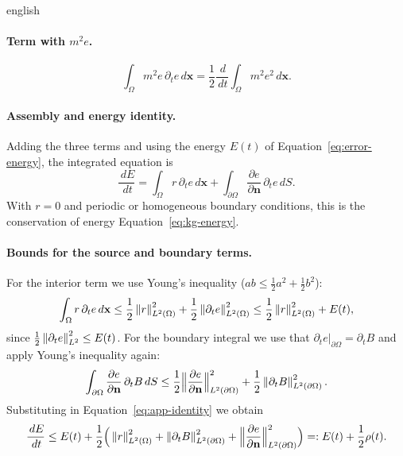 \documentclass[../0000.tex]{subfiles}
\begin{document}
\begin{hyphenrules}{english}
\paragraph{Term with $m^2e$.}
\[
  \int_\Omega m^2e\,\partial_te\,d\mathbf{x}=\frac12\frac{\,d}{\,d t}\int_\Omega m^2e^2\,d\mathbf{x}.
\]

\paragraph{Assembly and energy identity.}
Adding the three terms and using the energy $E(t)$ of Equation~\eqref{eq:error-energy}, the integrated equation is
\begin{equation}
  \frac{\,d E}{\,d t}=\int_\Omega r\,\partial_te\,d\mathbf{x}+\int_{\partial\Omega}\frac{\partial e}{\partial\mathbf{n}}\,\partial_te\,d S.
  \label{eq:app-identity}
\end{equation}
With $r=0$ and periodic or homogeneous boundary conditions, this is the conservation of energy
Equation~\eqref{eq:kg-energy}.

\paragraph{Bounds for the source and boundary terms.}
For the interior term we use Young's inequality ($ab\le\frac12a^2+\frac12b^2$):
\[
  \int_\Omega r\,\partial_te\,d\mathbf{x}\le\frac12\left\lVert r \right\rVert^2_{L^2(\Omega)}+\frac12\left\lVert \partial_te \right\rVert^2_{L^2(\Omega)}
  \le\frac12\left\lVert r \right\rVert^2_{L^2(\Omega)}+E(t),
\]
since $\frac12\left\lVert \partial_te \right\rVert^2_{L^2}\le E(t)$. For the boundary integral we use that
$\partial_te|_{\partial\Omega}=\partial_tB$ and apply Young's inequality again:
\[
  \int_{\partial\Omega}\frac{\partial e}{\partial\mathbf{n}}\,\partial_tB\,d S
  \le\frac12\Big\|\frac{\partial e}{\partial\mathbf{n}}\Big\|^2_{L^2(\partial\Omega)}+\frac12\left\lVert \partial_tB \right\rVert^2_{L^2(\partial\Omega)}.
\]
Substituting in Equation~\eqref{eq:app-identity} we obtain
\begin{equation}
  \frac{\,d E}{\,d t}\le E(t)+\frac12\Big(\left\lVert r \right\rVert^2_{L^2(\Omega)}+\left\lVert \partial_tB \right\rVert^2_{L^2(\partial\Omega)}
  +\Big\|\frac{\partial e}{\partial\mathbf{n}}\Big\|^2_{L^2(\partial\Omega)}\Big)=:E(t)+\frac12\rho(t).
  \label{eq:app-differential}
\end{equation}


\end{hyphenrules}
\end{document}
